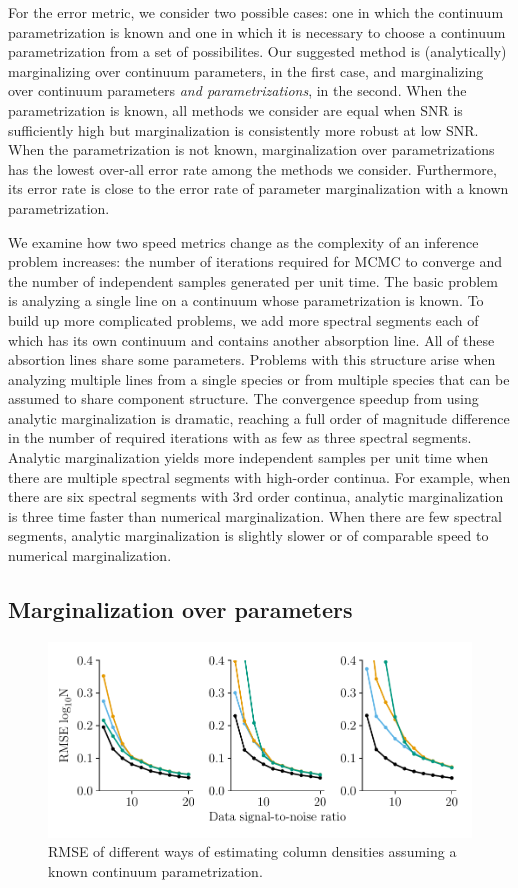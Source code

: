 \documentclass[manuscript]{aastex62}
\begin{document}
For the error metric, we consider two possible cases: one in which the continuum parametrization is known and one in which it is necessary to choose a continuum parametrization from a set of possibilites.
Our suggested method is (analytically) marginalizing over continuum parameters, in the first case, and marginalizing over continuum parameters \emph{and parametrizations}, in the second.
When the parametrization is known, all methods we consider are equal when SNR is sufficiently high but marginalization is consistently more robust at low SNR.
When the parametrization is not known, marginalization over parametrizations has the lowest over-all error rate among the methods we consider.
Furthermore, its error rate is close to the error rate of parameter marginalization with a known parametrization.

We examine how two speed metrics change as the complexity of an inference problem increases: the number of iterations required for MCMC to converge and the number of independent samples generated per unit time.
The basic problem is analyzing a single line on a continuum whose parametrization is known.
To build up more complicated problems, we add more spectral segments each of which has its own continuum and contains another absorption line.
All of these absortion lines share some parameters.
Problems with this structure arise when analyzing multiple lines from a single species or from multiple species that can be assumed to share component structure.
The convergence speedup from using analytic marginalization is dramatic, reaching a full order of magnitude difference in the number of required iterations with as few as three spectral segments.
Analytic marginalization yields more independent samples per unit time when there are multiple spectral segments with high-order continua.
For example, when there are six spectral segments with 3rd order continua, analytic marginalization is three time faster than numerical marginalization.
When there are few spectral segments, analytic marginalization is slightly slower or of comparable speed to numerical marginalization.

\subsection{Marginalization over parameters}
\begin{figure}
  \includegraphics[width=\linewidth]{figures/marginalized_unmarginalized_labeled.pdf}
  \caption{RMSE of different ways of estimating column densities assuming a known continuum parametrization.}
  \label{fig:order-known-comparison}
\end{figure}
\end{document}
